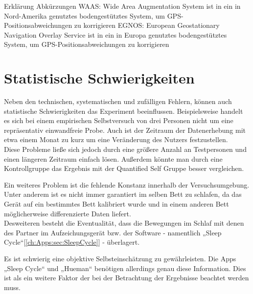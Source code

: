 Erklärung Abkürzungen
WAAS: 
Wide Area Augmentation System ist in ein in Nord-Amerika genutztes bodengestütztes System, um GPS-Positionsabweichungen zu korrigieren
EGNOS: 
European Geostationary Navigation Overlay Service ist in ein in Europa genutztes bodengestütztes System, um GPS-Positionsabweichungen zu korrigieren


\section{Statistische Schwierigkeiten}
\label{ch:Relativierung:sec:StatistischeSchwierigkeiten}

Neben den technischen, systematischen und zufälligen Fehlern, können auch statistische Schwierigkeiten das Experiment beeinflussen.
Beispielsweise handelt es sich bei einem empirischen Selbstversuch von drei Personen nicht um eine repräsentativ einwandfreie Probe.
Auch ist der Zeitraum der Datenerhebung mit etwa einem Monat zu kurz um eine Veränderung des Nutzers festzustellen. \\
Diese Probleme ließe sich jedoch durch eine größere Anzahl an Testpersonen und einen längeren Zeitraum einfach lösen.
Außerdem könnte man durch eine Kontrollgruppe das Ergebnis mit der Quantified Self Gruppe besser vergleichen. 

Ein weiteres Problem ist die fehlende Konstanz innerhalb der Versuchsumgebung.
Unter anderem ist es nicht immer garantiert im selben Bett zu schlafen, da das Gerät auf ein bestimmtes Bett kalibriert wurde und in einem anderen Bett möglicherweise differenzierte Daten liefert.\\
Desweiteren besteht die Eventualität, dass die Bewegungen im Schlaf mit denen des Partner im Aufzeichungsgerät bzw. der Software - namentlich „Sleep Cycle“[\ref{ch:Apps:sec:SleepCycle}] - überlagert.

Es ist schwierig eine objektive Selbsteinschätzung zu gewährleisten. Die Apps „Sleep Cycle“ und „Hueman“ benötigen allerdings genau diese Information.
Dies ist als ein weitere Faktor der bei der Betrachtung der Ergebnisse beachtet werden muss.








